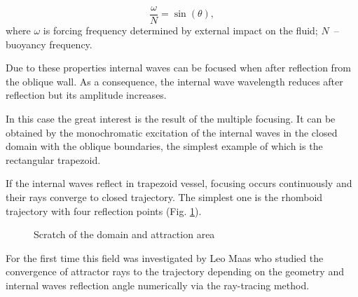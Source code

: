 \documentclass{article}
\begin{document}
$$\frac{\omega}{N} = \sin(\theta),$$
where $\omega$ is forcing frequency determined by external impact on the fluid; 
$N$~-- buoyancy frequency.


Due to these properties internal waves can be focused when after reflection from the oblique wall. As a consequence,  the internal wave wavelength reduces after reflection but its amplitude increases.


In this case the great interest is the result of the multiple focusing. It can be obtained by the monochromatic excitation of the internal waves in the closed domain with the oblique boundaries, the simplest example of which is the rectangular trapezoid.

If the internal waves reflect in trapezoid vessel, focusing occurs continuously and their rays converge to closed trajectory. The simplest one is the rhomboid trajectory with four reflection points (Fig. \ref{fig:dominleft}).

\begin{figure}[!ht]
    \centering
    \caption{Scratch of the domain and attraction area}
    \label{fig:dominleft}
\end{figure}



For the first time this field was investigated by Leo Maas \cite{Maas1995} who studied the convergence of attractor rays to the trajectory depending on the geometry and internal waves reflection angle numerically via the ray-tracing method.
\end{document}

